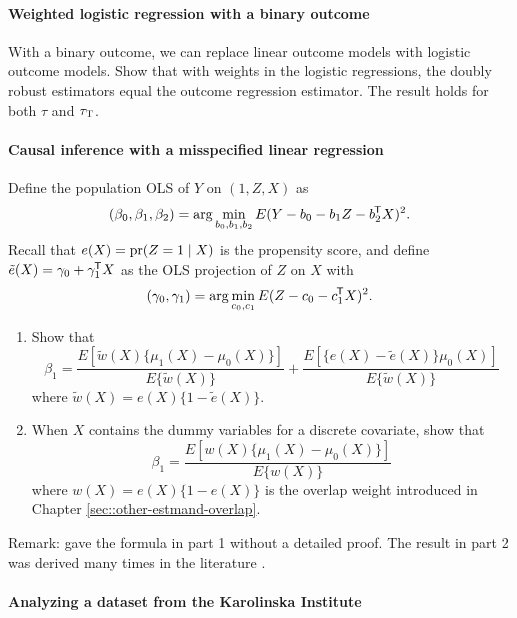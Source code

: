 \paragraph{Weighted logistic regression  with a binary outcome}
\label{hw::wlogit-dr}
With a binary outcome, we can replace linear outcome models with logistic outcome models. Show that with weights in the logistic regressions, the doubly robust estimators equal the outcome regression estimator. The result holds for both $\tau$ and $\tau_\textsc{T}$. 



\paragraph{Causal inference with a misspecified linear regression}




Define the population OLS of $Y$ on $ (1, Z, X) $ as
$$
(\beta_0, \beta_1, \beta_2) = \arg\min_{b_0, b_1, b_2}   E(Y - b_0 - b_1 Z - b_2^{\mkern-1.5mu\mathsf{T}} X)^2. 
$$
Recall that $e(X) = \textup{pr}(Z=1\mid X)$ is the propensity score, and define $\tilde{e}(X) = \gamma_0+\gamma_1^{\mkern-1.5mu\mathsf{T}} X$ as the OLS projection of $Z$ on $X$ with%
$$
(\gamma_0, \gamma_1) =  \arg\min_{c_0, c_1}   E(Z - c_0 -  c_1^{\mkern-1.5mu\mathsf{T}} X)^2. 
$$

\begin{enumerate}
\item
Show that
$$
\beta_1 = \frac{    E [  \tilde{w}(X) \{ \mu_1(X) - \mu_0(X) \} ]  }{   E \{ \tilde{w}(X) \} }
+ \frac{  E [  \{  e(X) - \tilde{e}(X)  \}  \mu_0(X)  ] }{  E \{ \tilde{w}(X) \}  }
$$
where $\tilde{w}(X) = e(X)\{ 1 - \tilde{e}(X)  \}$. 

\item
When $X$ contains the dummy variables for a discrete covariate, show that
$$
\beta_1 = \frac{    E [  w(X) \{ \mu_1(X) - \mu_0(X) \} ]  }{   E \{ w(X) \} }
$$
where $w(X) = e(X)\{ 1 - e(X)  \}$ is the overlap weight introduced in Chapter \ref{sec::other-estmand-overlap}. 

\end{enumerate}


Remark: \citet{vansteelandt2021assumption} gave the formula in part 1 without a detailed proof. The result in part 2 was derived many times in the literature \citep[e.g.,][]{angrist1998estimating, ding2021frisch}. 


\paragraph{Analyzing a dataset from the Karolinska Institute}\label{hw::Karolinska-pscore}

